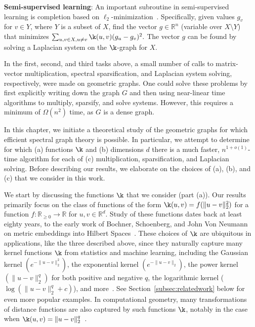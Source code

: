 \begin{tight_enumerate}
\item \textbf{Semi-supervised learning}: An important subroutine in
semi-supervised learning is completion based on
$\ell_2$-minimization~\cite{z05, z05survey, lszlh19}. Specifically,
  given values $g_v$ for $v\in Y$, where $Y$ is a subset of $X$, find
  the vector $g\in \mathbb{R}^n$ (variable over $X\setminus Y$) that
  minimizes $\sum_{u,v\in X,u\ne v} \k(u,v) (g_u - g_v)^2.$ The vector
  $g$ can be found by solving a Laplacian system on the $\k$-graph for
  $X$.  \end{tight_enumerate} \vspace{1mm}

In the first, second, and third tasks above, a small number of calls to
matrix-vector multiplication, spectral sparsification, and Laplacian
system solving, respectively, were made on geometric graphs. One could
solve these problems by first explicitly writing down the graph $G$ and
then using near-linear time algorithms \cite{ss11,ckmpprx14} to
multiply, sparsify, and solve systems. However, this requires a minimum
of $\Omega(n^2)$ time, as $G$ is a dense graph.

In this chapter, we initiate a theoretical study of the geometric graphs
for which efficient spectral graph theory is possible. In particular, we
attempt to determine for which (a) functions $\k$ and (b) dimensions $d$
there is a much faster, $n^{1+o(1)}$-time algorithm for each of (c)
  multiplication, sparsification, and Laplacian solving. Before
  describing our results, we elaborate on the choices of (a), (b), and
  (c) that we consider in this work.

We start by discussing the functions $\k$ that we consider (part (a)).
Our results primarily focus on the class of functions of the form
$\k(u,v) = f(\|u-v\|_2^2)$ for a function $f:\mathbb{R}_{\ge
  0}\rightarrow \mathbb{R}$ for $u,v\in \mathbb{R}^d$. Study of these
  functions dates back at least eighty years, to the early work of
  Bochner, Schoenberg, and John Von Neumann on metric embeddings into
  Hilbert Spaces~\cite{b33, s37, ns41}. These choices of $\k$ are
  ubiquitous in applications, like the three described above, since they
  naturally capture many kernel functions $\k$ from statistics and
  machine learning, including the Gaussian kernel $(e^{-\|u-v\|_2^2})$,
  the exponential kernel $(e^{-\|u-v\|_2})$, the power kernel
  $(\|u-v\|_2^q)$ for both positive and negative $q$, the logarithmic
  kernel ($\log (\|u-v\|_2^q + c)$), and more~\cite{s10, z05, btb05}.
  See Section~\ref{subsec:relatedwork} below for even more popular
  examples. In computational geometry, many transformations of distance
  functions are also captured by such functions $\k$, notably in the
  case when $\k(u,v) = \|u-v\|_2^q$~\cite{l82, as14,acx19, cms20}. 

